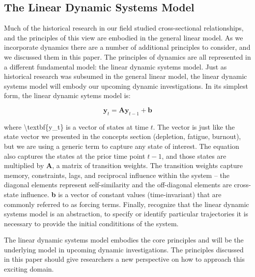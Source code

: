 \documentclass[english,,man]{apa6}
\theoremstyle{definition}
\theoremstyle{definition}
\theoremstyle{definition}
\theoremstyle{remark}
\begin{document}
\hypertarget{the-linear-dynamic-systems-model}{%
\subsection{The Linear Dynamic Systems
Model}\label{the-linear-dynamic-systems-model}}

Much of the historical research in our field studied cross-sectional
relationships, and the principles of this view are embodied in the
general linear model. As we incorporate dynamics there are a number of
additional principles to consider, and we discussed them in this paper.
The principles of dynamics are all represented in a different
fundamental model: the linear dynamic systems model. Just as historical
research was subsumed in the general linear model, the linear dynamic
systems model will embody our upcoming dynamic investigations. In its
simplest form, the linear dynamic sytems model is:

\begin{equation}
\textbf{y}_t = \textbf{A} \textbf{y}_{t-1} + \textbf{b}
\end{equation}

\noindent where \textbackslash{}textbf\{y\_t\} is a vector of states at
time \(t\). The vector is just like the state vector we presented in the
concepts section (depletion, fatigue, burnout), but we are using a
generic term to capture any state of interest. The equation also
captures the states at the prior time point \(t-1\), and those states
are multiplied by \textbf{A}, a matrix of transition weights. The
transition weights capture memory, constraints, lags, and reciprocal
influence within the system -- the diagonal elements represent
self-similarity and the off-diagonal elements are cross-state influence.
\textbf{b} is a vector of constant values (time-invariant) that are
commonly referred to as forcing terms. Finally, recognize that the
linear dynamic systems model is an abstraction, to specify or identify
particular trajectories it is necessary to provide the initial
condititions of the system.

The linear dynamic systems model embodies the core principles and will
be the underlying model in upcoming dynamic investigations. The
principles discussed in this paper should give researchers a new
perspective on how to approach this exciting domain.
\end{document}
